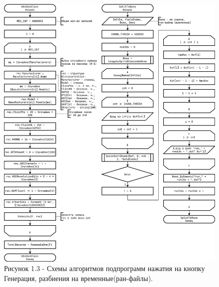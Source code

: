 \documentclass[oneside,a4paper,14pt]{extarticle}
\begin{document}
\clearpage
\begin{figure}[H]
	\centering
	\includegraphics[height=0.9\textheight]{pics/flowchart3.png}
	\caption*{Рисунок 1.3 - Схемы алгоритмов подпрограмм нажатия на кнопку Генерация, разбиения на временные(ран-файлы).}
\end{figure}
\end{document}
